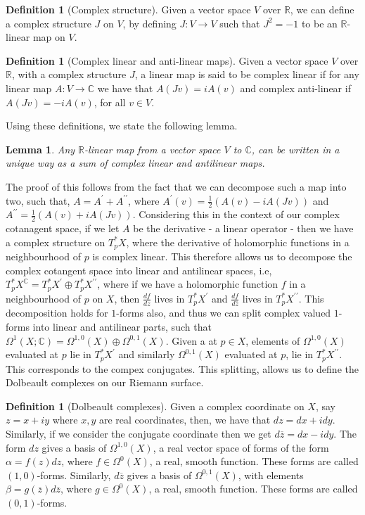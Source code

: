 \documentclass[11pt]{report}
\newtheorem{lemma}[thm]{Lemma}
\theoremstyle{definition}
\newtheorem{defn}[thm]{Definition}
\begin{document}
\begin{defn}[Complex structure]\label{Cstructure}
  Given a vector space $V$ over $\mathbb{R}$, we can define a complex structure $J$ on $V$, by defining $J : V \rightarrow V$ such that $J^2 = -1$ to be an $\mathbb{R}$-linear map on $V$.
\end{defn}
\begin{defn}[Complex linear and anti-linear maps]
  Given a vector space $V$ over $\mathbb{R}$, with a complex structure $J$, a linear map is said to be complex linear if for any linear map $A: V \rightarrow \mathbb{C}$ we have that $A(Jv)=iA(v)$ and complex anti-linear if $A(Jv) = -iA(v)$, for all $v \in V$.
\end{defn}
Using these definitions, we state the following lemma.
\begin{lemma}
  Any $\mathbb{R}$-linear map from a vector space $V$ to $\mathbb{C}$, can be written in a unique way as a sum of complex linear and antilinear maps.
\end{lemma}
The proof of this follows from the fact that we can decompose such a map into two, such that, $A = A^{\prime} + A^{\prime\prime}$, where $A^{\prime}(v) = \frac{1}{2}(A(v)-iA(Jv))$ and $A^{\prime\prime} = \frac{1}{2}(A(v)+iA(Jv))$. Considering this in the context of our complex cotanagent space, if we let $A$ be the derivative - a linear operator - then we have a complex structure on $T_p^*X$, where the derivative of holomorphic functions in a neighbourhood of $p$ is complex linear. This therefore allows us to decompose the complex cotangent space into linear and antilinear spaces, i.e, $T_p^*X^{\mathbb{C}} = T_p^*X^{\prime} \oplus T_p^*X^{\prime\prime}$, where if we have a holomorphic function $f$ in a neighbourhood of $p$ on $X$, then $\frac{df}{dz}$ lives in $T_p^*X^{\prime}$ and $\frac{df}{d\overline{z}}$ lives in $T_p^*X^{\prime\prime}$. This decomposition holds for $1$-forms also, and thus we can split complex valued $1$-forms into linear and antilinear parts, such that $\Omega^1(X;\mathbb{C}) = \Omega^{1,0}(X) \oplus \Omega^{0,1}(X)$. Given a at $p \in X$, elements of $\Omega^{1,0}(X)$ evaluated at $p$ lie in $T_p^*X^{\prime}$ and similarly $\Omega^{0,1}(X)$ evaluated at $p$, lie in $T_p^*X^{\prime\prime}$. This corresponds to the compex conjugates. This splitting, allows us to define the Dolbeault complexes on our Riemann surface.
\begin{defn}[Dolbeault complexes]
  Given a complex coordinate on $X$, say $z=x+iy$ where $x,y$ are real coordinates, then, we have that $dz = dx+idy$. Similarly, if we consider the conjugate coordinate then we get $d\overline{z} = dx - idy$. The form $dz$ gives a basis of $\Omega^{1,0}(X)$, a real vector space of forms of the form $\alpha = f(z)dz$, where $f \in \Omega^0(X)$, a real, smooth function. These forms are called $(1,0)$-forms. Similarly, $d\overline{z}$ gives a basis of $\Omega^{0,1}(X)$, with elements $\beta = g(\overline{z})d\overline{z}$, where $g \in \Omega^0(X)$, a real, smooth function. These forms are called $(0,1)$-forms.
\end{defn}
\end{document}
